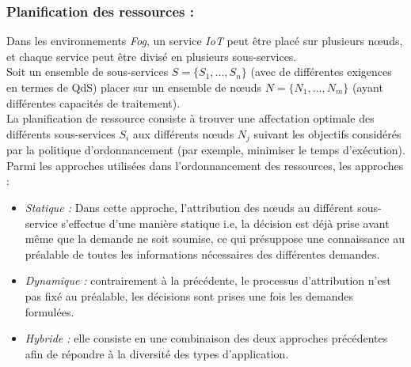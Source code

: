 \subsubsection{Planification des ressources :}
Dans les environnements \emph{Fog}, un service \emph{IoT} peut être placé sur plusieurs nœuds, et chaque service peut être divisé en plusieurs sous-services.\\ 
Soit un ensemble de sous-services $S=\{S_{1},...,S_{n}\}$ (avec de différentes exigences en termes de QdS) placer sur un ensemble de nœuds $N=\{N_{1},...,N_{m}\}$ (ayant différentes capacités de traitement).\\
La planification de ressource consiste à trouver une affectation optimale des différents sous-services $S_{i}$ aux différents nœuds $N_{j}$ suivant les objectifs considérés par la politique d'ordonnancement (par exemple, minimiser le temps d'exécution).\\
Parmi les approches utilisées dans l'ordonnancement des ressources, les approches : 
\begin{itemize}
  \item \emph{Statique :} Dans cette approche, l'attribution des nœuds au différent sous-service s'effectue d'une manière statique i.e, la décision est déjà prise avant même que la demande ne soit soumise, ce qui présuppose une connaissance au préalable de toutes les informations nécessaires des différentes demandes.
  \item \emph{Dynamique :} contrairement à la précédente, le processus d'attribution  n'est pas fixé au préalable, les décisions sont prises une fois les demandes formulées.
  \item \emph{Hybride :} elle consiste en une combinaison des deux approches précédentes afin de répondre à la diversité des types d'application. 
\end{itemize}

